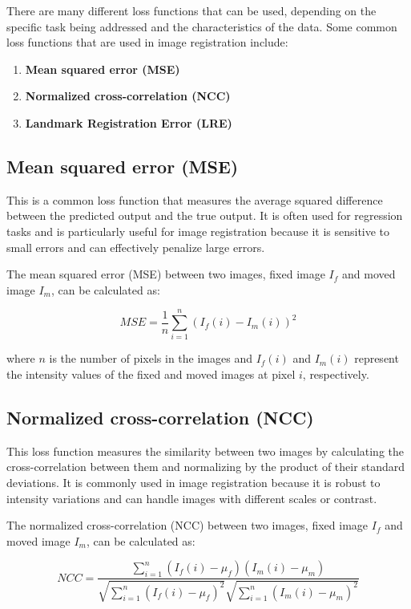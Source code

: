 \documentclass{book}
\begin{document}
	There are many different loss functions that can be used, depending on the specific task being addressed and the characteristics of the data. Some common loss functions that are used in image registration include:
	
	\begin{enumerate}
		\item \textbf{Mean squared error (MSE)}
		\item \textbf{Normalized cross-correlation (NCC)}
		\item \textbf{Landmark Registration Error (LRE)}
	\end{enumerate}
	
	\subsection{Mean squared error (MSE)}
	This is a common loss function that measures the average squared difference between the predicted output and the true output. It is often used for regression tasks and is particularly useful for image registration because it is sensitive to small errors and can effectively penalize large errors.
	
	The mean squared error (MSE) between two images, fixed image $I_f$ and moved image $I_m$, can be calculated as:
	
	$$ MSE = \frac{1}{n} \sum_{i=1}^n (I_f(i) - I_m(i))^2 $$
	
	where $n$ is the number of pixels in the images and $I_f(i)$ and $I_m(i)$ represent the intensity values of the fixed and moved images at pixel $i$, respectively.
	
	\subsection{Normalized cross-correlation (NCC)}
	This loss function measures the similarity between two images by calculating the cross-correlation between them and normalizing by the product of their standard deviations. It is commonly used in image registration because it is robust to intensity variations and can handle images with different scales or contrast.
	
	
	The normalized cross-correlation (NCC) between two images, fixed image $I_f$ and moved image $I_m$, can be calculated as:
	
	$$ NCC = \frac{\sum_{i=1}^n (I_f(i) - \mu_f)(I_m(i) - \mu_m)}{\sqrt{\sum_{i=1}^n (I_f(i) - \mu_f)^2}\sqrt{\sum_{i=1}^n (I_m(i) - \mu_m)^2}} $$
	
\end{document}
